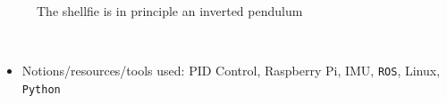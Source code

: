 {\begin{minipage}{\linewidth}
\begin{minipage}{0.45\linewidth}
\begin{figure}[H]
      \caption{\small The shellfie is in principle an inverted pendulum}
      \label{fig:shellfie_schem}
    \end{figure}
  \end{minipage}
\end{minipage}
}\\

\begin{itemize}
  \item Notions/resources/tools used: PID Control, Raspberry Pi, IMU, \texttt{ROS}, Linux, \texttt{Python}
\end{itemize}
